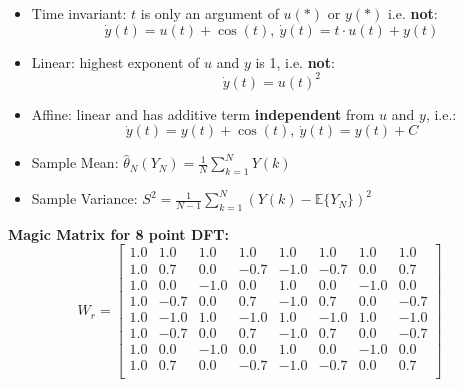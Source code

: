 \begin{tcolorbox}[colback=violet!5!white,colframe=violet!75!black,title=\textbf{Useful hints and practices}]
  \begin{itemize}
  \item Time invariant: $t$ is only an argument of $u(*)$ or $y(*)$ i.e. \textbf{not}:
	\begin{equation*}
	  \dot{y}(t)=u(t)+\cos(t),\ \dot{y}(t)=t\cdot u(t) + y(t)
	\end{equation*}
  \item Linear: highest exponent of $u$ and $y$ is 1, i.e. \textbf{not}:
	\begin{equation*}
	  \dot{y}(t)=u(t)^2
	\end{equation*}
  \item Affine: linear and has additive term \textbf{independent} from $u$ and $y$, i.e.:
	\begin{equation*}
	  \dot{y}(t)=y(t)+\cos(t),\ \dot{y}(t)=y(t)+C
	\end{equation*}
  \item Sample Mean: $\hat{\theta}_N(Y_N)=\frac{1}{N}\sum^N_{k=1}Y(k)$
  \item Sample Variance: $S^2=\frac{1}{N-1}\sum^N_{k=1}(Y(k)-\mathbb{E}\{Y_N\})^2$
  \end{itemize}
  \textbf{Magic Matrix for 8 point DFT:}
  \begin{equation*}W_r=\left[ 
  \begin{array}{rrrrrrrr}
	1.0&1.0&1.0&1.0&1.0&1.0&1.0&1.0\\
	1.0&0.7&0.0&-0.7&-1.0&-0.7&0.0&0.7\\
	1.0&0.0&-1.0&0.0&1.0&0.0&-1.0&0.0\\
	1.0&-0.7&0.0&0.7&-1.0&0.7&0.0&-0.7\\
	1.0&-1.0&1.0&-1.0&1.0&-1.0&1.0&-1.0\\
	1.0&-0.7&0.0&0.7&-1.0&0.7&0.0&-0.7\\
	1.0&0.0&-1.0&0.0&1.0&0.0&-1.0&0.0\\
	1.0&0.7&0.0&-0.7&-1.0&-0.7&0.0&0.7\\
  \end{array} \right]
\end{equation*}
\end{tcolorbox}

